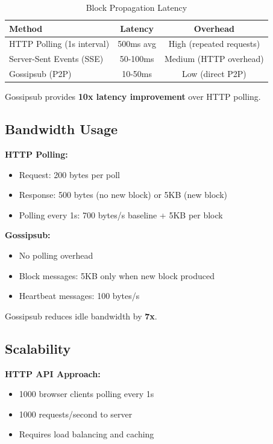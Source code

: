 \documentclass[11pt,a4paper]{article}
\begin{document}
\begin{table}[h]
\centering
\begin{tabular}{|l|c|c|}
\hline
\textbf{Method} & \textbf{Latency} & \textbf{Overhead} \\
\hline
HTTP Polling (1s interval) & 500ms avg & High (repeated requests) \\
\hline
Server-Sent Events (SSE) & 50-100ms & Medium (HTTP overhead) \\
\hline
Gossipsub (P2P) & 10-50ms & Low (direct P2P) \\
\hline
\end{tabular}
\caption{Block Propagation Latency}
\end{table}

Gossipsub provides \textbf{10x latency improvement} over HTTP polling.

\subsection{Bandwidth Usage}

\textbf{HTTP Polling:}
\begin{itemize}
    \item Request: 200 bytes per poll
    \item Response: 500 bytes (no new block) or 5KB (new block)
    \item Polling every 1s: 700 bytes/s baseline + 5KB per block
\end{itemize}

\textbf{Gossipsub:}
\begin{itemize}
    \item No polling overhead
    \item Block messages: 5KB only when new block produced
    \item Heartbeat messages: 100 bytes/s
\end{itemize}

Gossipsub reduces idle bandwidth by \textbf{7x}.

\subsection{Scalability}

\textbf{HTTP API Approach:}
\begin{itemize}
    \item 1000 browser clients polling every 1s
    \item 1000 requests/second to server
    \item Requires load balancing and caching
\end{itemize}
\end{document}
